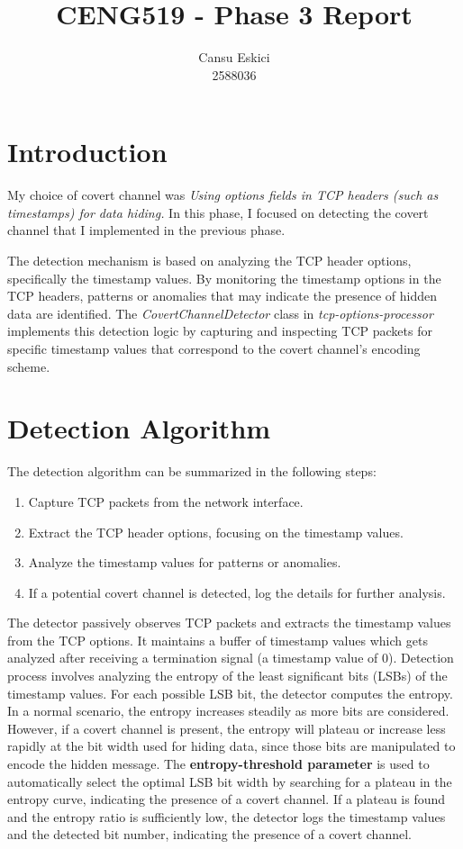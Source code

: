 \documentclass[10pt,a4paper]{article}
\title{CENG519 - Phase 3 Report}
\author{
  Cansu Eskici\\
  2588036}
\begin{document}
\maketitle
\section*{Introduction}
My choice of covert channel was \textit{Using options fields in TCP headers (such as timestamps) for data hiding.} 
In this phase, I focused on detecting the covert channel that I implemented in the previous phase.  

The detection mechanism is based on analyzing the TCP header options, specifically the timestamp values.
 By monitoring the timestamp options in the TCP headers, patterns or anomalies that may indicate the presence of hidden data are identified.
  The \textit{CovertChannelDetector} class in \textit{tcp-options-processor} implements this detection logic by capturing and inspecting TCP packets for specific timestamp values that correspond to the covert channel's encoding scheme.

\section*{Detection Algorithm}
The detection algorithm can be summarized in the following steps:
\begin{enumerate}
    \item Capture TCP packets from the network interface.
    \item Extract the TCP header options, focusing on the timestamp values.
    \item Analyze the timestamp values for patterns or anomalies.
    \item If a potential covert channel is detected, log the details for further analysis.
\end{enumerate}

The detector passively observes TCP packets and extracts the timestamp values from the TCP options. 
It maintains a buffer of timestamp values which gets analyzed after receiving a termination signal (a timestamp value of 0).
Detection process involves analyzing the entropy of the least significant bits (LSBs) of the timestamp values. 
For each possible LSB bit, the detector computes the entropy. In a normal scenario, the entropy increases steadily as more bits are considered.
However, if a covert channel is present, the entropy will plateau or increase less rapidly at the bit width used for hiding data, since those bits are manipulated to encode the hidden message.
The \textbf{entropy-threshold parameter} is used to automatically select the optimal LSB bit width by searching for a plateau in the entropy curve, indicating the presence of a covert channel.
If a plateau is found and the entropy ratio is sufficiently low, the detector logs the timestamp values and the detected bit number, indicating the presence of a covert channel.
\end{document}
